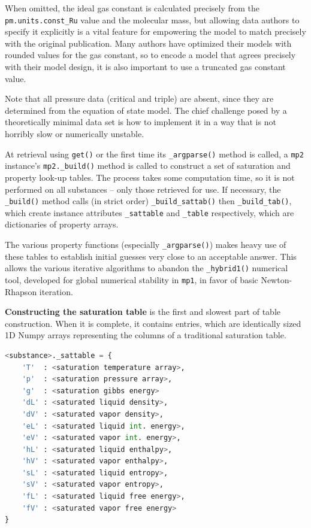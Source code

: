 When omitted, the ideal gas constant is calculated precisely from the \verb|pm.units.const_Ru| value and the molecular mass, but allowing data authors to specify it explicitly is a vital feature for empowering the model to match precisely with the original publication.  Many authors have optimized their models with rounded values for the gas constant, so to encode a model that agrees precisely with their model design, it is also important to use a truncated gas constant value.

Note that all pressure data (critical and triple) are absent, since they are determined from the equation of state model.  The chief challenge posed by a theoretically minimal data set is how to implement it in a way that is not horribly slow or numerically unstable.

At retrieval using \texttt{get()} or the first time its \verb|_argparse()| method is called, a \texttt{mp2} instance's \verb|mp2._build()| method is called to construct a set of saturation and property look-up tables.  The process takes some computation time, so it is not performed on all substances -- only those retrieved for use.  If necessary, the \verb|_build()| method calls (in strict order) \verb|_build_sattab()| then \verb|_build_tab()|, which create instance attributes \verb|_sattable| and \verb|_table| respectively, which are dictionaries of property arrays.  

The various property functions (especially \verb|_argparse()|) makes heavy use of these tables to establish initial guesses very close to an acceptable answer.  This allows the various iterative algorithms to abandon the \verb|_hybrid1()| numerical tool, developed for global numerical stability in \texttt{mp1}, in favor of basic Newton-Rhapson iteration.

\textbf{Constructing the saturation table} is the first and slowest part of table construction.  When it is complete, it contains entries, which are identically sized 1D Numpy arrays representing the columns of a traditional saturation table.
\begin{lstlisting}[language=Python]
<substance>._sattable = {
    'T'  : <saturation temperature array>,
    'p'  : <saturation pressure array>,
    'g'  : <saturation gibbs energy>
    'dL' : <saturated liquid density>, 
    'dV' : <saturated vapor density>,
    'eL' : <saturated liquid int. energy>,
    'eV' : <saturated vapor int. energy>, 
    'hL' : <saturated liquid enthalpy>, 
    'hV' : <saturated vapor enthalpy>,
    'sL' : <saturated liquid entropy>, 
    'sV' : <saturated vapor entropy>, 
    'fL' : <saturated liquid free energy>, 
    'fV' : <saturated vapor free energy>
}
\end{lstlisting}

